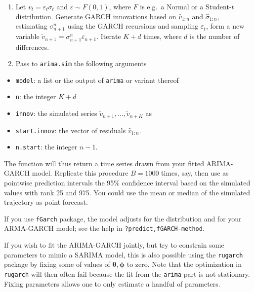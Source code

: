\documentclass[]{book}
\providecommand{\tightlist}{%
  \setlength{\itemsep}{0pt}\setlength{\parskip}{0pt}}
\begin{document}
\begin{enumerate}
\def\labelenumi{\arabic{enumi}.}
\tightlist
\item
  Let \(v_t=\varepsilon_t\sigma_t\) and \(\varepsilon \sim F(0, 1)\),
  where \(F\) is e.g.~a Normal or a Student-\(t\) distribution. Generate
  GARCH innovations based on \(\widehat{v}_{1:n}\) and
  \(\widehat{\sigma}_{1:n}\), estimating \({\sigma}_{n+1}^{n}\) using
  the GARCH recursions and sampling \(\varepsilon_t\), form a new
  variable
  \(\widetilde{v}_{n+1} = {\sigma}_{n+1}^{n}\varepsilon_{n+1}\). Iterate
  \(K+d\) times, where \(d\) is the number of differences.
\item
  Pass to \texttt{arima.sim} the following arguments
\end{enumerate}

\begin{itemize}
\tightlist
\item
  \texttt{model}: a list or the output of \texttt{arima} or variant
  thereof
\item
  \texttt{n}: the integer \(K+d\)
\item
  \texttt{innov}: the simulated series
  \(\widetilde{v}_{n+1}, \ldots, \widetilde{v}_{n+K}\) as
\item
  \texttt{start.innov}: the vector of residuals \(\widehat{v}_{1:n}\).
\item
  \texttt{n.start}: the integer \(n-1\).
\end{itemize}

The function will thus return a time series drawn from your fitted
ARIMA-GARCH model. Replicate this procedure \(B=1000\) times, say, then
use as pointwise prediction intervals the 95\% confidence interval based
on the simulated values with rank 25 and 975. You could use the mean or
median of the simulated trajectory as point forecast.

If you use \texttt{fGarch} package, the model adjusts for the
distribution and for your ARMA-GARCH model; see the help in
\texttt{?\textquotesingle{}predict,fGARCH-method\textquotesingle{}}.

If you wish to fit the ARIMA-GARCH jointly, but try to constrain some
parameters to mimic a SARIMA model, this is also possible using the
\texttt{rugarch} package by fixing some of values of
\(\boldsymbol{\theta}, \boldsymbol{\phi}\) to zero. Note that the
optimization in \texttt{rugarch} will then often fail because the fit
from the \texttt{arima} part is not stationary. Fixing parameters allows
one to only estimate a handful of parameters.
\end{document}
